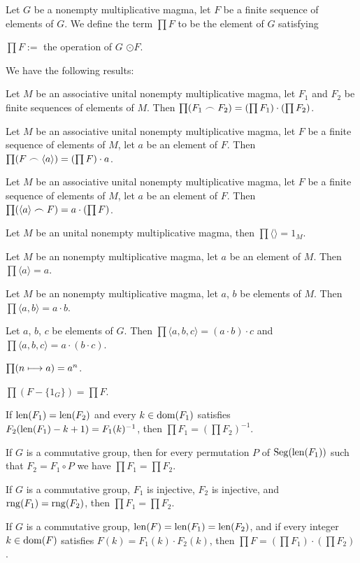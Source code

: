 \documentclass{article}
\begin{document}
\begin{definition}
Let $G$ be a nonempty multiplicative magma, let $F$ be a finite sequence
of elements of $G$. We define the term $\prod F$ to be the element of
$G$ satisfying
\begin{defn}
\item $\prod F :=$ the operation of $G$ $\odot F$.
\end{defn}
\end{definition}

We have the following results:
\begin{thm}
\item\label{group4:5} Let $M$ be an associative unital nonempty
  multiplicative magma, let $F_{1}$ and $F_{2}$ be finite sequences of
  elements of $M$. Then $\prod(F_{1}\frown F_{2})=(\prod F_{1})\cdot(\prod F_{2})$.
\item\label{group4:6} Let $M$ be an associative unital nonempty
  multiplicative magma, let $F$ be a finite sequence of
  elements of $M$, let $a$ be an element of $F$.
  Then $\prod(F\frown\langle a\rangle)=(\prod F)\cdot a$.
\item\label{group4:7} Let $M$ be an associative unital nonempty
  multiplicative magma, let $F$ be a finite sequence of
  elements of $M$, let $a$ be an element of $F$.
  Then $\prod(\langle a\rangle\frown F)=a\cdot(\prod F)$.
\item\label{group4:8} Let $M$ be an unital nonempty
  multiplicative magma, then $\prod\langle\rangle=1_{M}$.
\item\label{group4:9} Let $M$ be an nonempty
  multiplicative magma, let $a$ be an element of $M$.
  Then $\prod\langle a\rangle = a$.
\item\label{group4:10} Let $M$ be an nonempty
  multiplicative magma, let $a$, $b$ be elements of $M$.
  Then $\prod\langle a,b\rangle = a\cdot b$.
\item\label{group4:11} Let $a$, $b$, $c$ be elements of $G$.
  Then $\prod\langle a,b,c\rangle = (a\cdot b)\cdot c$
  and $\prod\langle a,b,c\rangle = a\cdot(b\cdot c)$.
\item\label{group4:12} $\prod(n\longmapsto a)=a^{n}$.
\item\label{group4:13} $\prod(F-\{1_{G}\})=\prod F$.
\item\label{group4:14} If $\operatorname{len}(F_{1})=\operatorname{len}(F_{2})$ and every $k\in\operatorname{dom}(F_{1})$
  satisfies $F_{2}(\operatorname{len}(F_{1})-k+1)=F_{1}(k)^{-1}$, then $\prod F_{1}=(\prod F_{2})^{-1}$.
\item\label{group4:15} If $G$ is a commutative group,
  then for every permutation $P$ of $\operatorname{Seg}(\operatorname{len}(F_{1}))$ such that
  $F_{2}=F_{1}\circ P$ we have $\prod F_{1}=\prod F_{2}$.
\item\label{group4:16} If $G$ is a commutative group, $F_{1}$ is
  injective, $F_{2}$ is injective, and $\operatorname{rng}(F_{1})=\operatorname{rng}(F_{2})$,
  then $\prod F_{1}=\prod F_{2}$.
\item\label{group4:17} If $G$ is a commutative group, $\operatorname{len}(F)=\operatorname{len}(F_{1})=\operatorname{len}(F_{2})$,
  and if every integer $k\in\operatorname{dom}(F)$ satisfies $F(k)=F_{1}(k)\cdot F_{2}(k)$,
  then $\prod F=(\prod F_{1})\cdot(\prod F_{2})$.
\item\label{group4:18} 
\end{thm}
\end{document}
